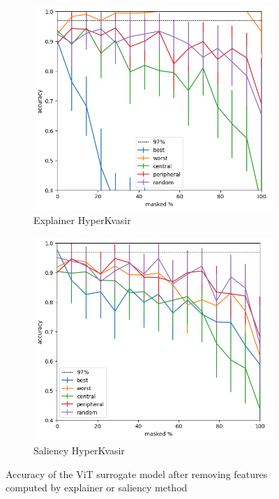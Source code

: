 \documentclass[magisterska,en]{pracamgr}
\begin{document}
\begin{figure}
\centering
\begin{subfigure}{.7\textwidth}
  \centering
  \includegraphics[width=.8\linewidth]{./images/vit_gastro_masking_explainer_patches_accuracy_half-0.png}
  \caption{Explainer HyperKvasir}
  \label{fig:sub1}
\end{subfigure}%
\begin{subfigure}{.7\textwidth}
  \centering
  \includegraphics[width=.8\linewidth]
{./images/vit_gastro_masking_saliency_patches_accuracy_half-0.png}
  \caption{Saliency HyperKvasir}
  \label{fig:sub2}
\end{subfigure}
\caption{Accuracy of the ViT surrogate model after removing features computed by explainer or saliency method}
\label{fig:ViT_Saliency_Explainer_HyperKvasir}
\end{figure}
\end{document}

